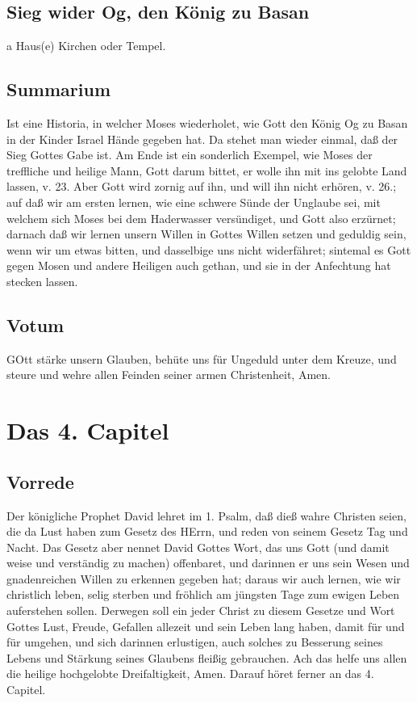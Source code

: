 \section{Sieg wider Og, den König zu Basan}

a Haus(e) Kirchen oder Tempel.

\section{Summarium}

Ist eine Historia, in welcher Moses wiederholet, wie Gott den König Og zu Basan in der Kinder Israel Hände gegeben hat. Da stehet man wieder einmal, daß der Sieg Gottes Gabe ist. Am Ende ist ein sonderlich Exempel, wie Moses der treffliche und heilige Mann, Gott darum bittet, er wolle ihn mit ins gelobte Land lassen, v. 23. Aber Gott wird zornig auf ihn, und will ihn nicht erhören, v. 26.; auf daß wir am ersten lernen, wie eine schwere Sünde der Unglaube sei, mit welchem sich Moses bei dem Haderwasser versündiget, und Gott also erzürnet; darnach daß wir lernen unsern Willen in Gottes Willen setzen und geduldig sein, wenn wir um etwas bitten, und dasselbige uns nicht widerfähret; sintemal es Gott gegen Mosen und andere Heiligen auch gethan, und sie in der Anfechtung hat stecken lassen.

\section{Votum}

GOtt stärke unsern Glauben, behüte uns für Ungeduld unter dem Kreuze, und steure und wehre allen Feinden seiner armen Christenheit, Amen.

\chapter{Das 4. Capitel}

\section{Vorrede}

Der königliche Prophet David lehret im 1. Psalm, daß dieß wahre Christen seien, die da Lust haben zum Gesetz des HErrn, und reden von seinem Gesetz Tag und Nacht. Das Gesetz aber nennet David Gottes Wort, das uns Gott (und damit weise und verständig zu machen) offenbaret, und darinnen er uns sein Wesen und gnadenreichen Willen zu erkennen gegeben hat; daraus wir auch lernen, wie wir christlich leben, selig sterben und fröhlich am jüngsten Tage zum ewigen Leben auferstehen sollen. Derwegen soll ein jeder Christ zu diesem Gesetze und Wort Gottes Lust, Freude, Gefallen allezeit und sein Leben lang haben, damit für und für umgehen, und sich darinnen erlustigen, auch solches zu Besserung seines Lebens und Stärkung seines Glaubens fleißig gebrauchen. Ach das helfe uns allen die heilige hochgelobte Dreifaltigkeit, Amen. Darauf höret ferner an das 4. Capitel.

